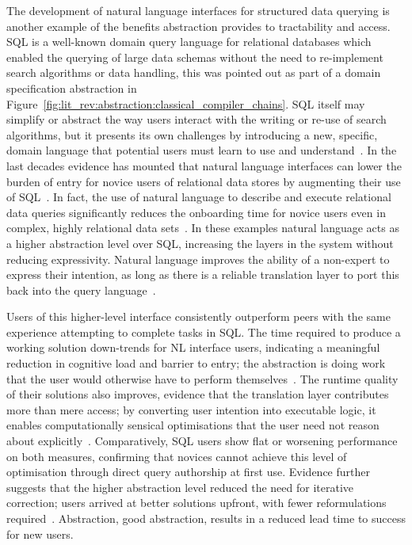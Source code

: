 The development of natural language interfaces for structured data querying is another example of the benefits abstraction provides to tractability and access.
SQL is a well-known domain query language for relational databases which enabled the querying of large data schemas without the need to re-implement search algorithms or data handling, this was pointed out as part of a domain specification abstraction in Figure~\ref{fig:lit_rev:abstraction:classical_compiler_chains}.
SQL itself may simplify or abstract the way users interact with the writing or re-use of search algorithms, but it presents its own challenges by introducing a new, specific, domain language that potential users must learn to use and understand~\cite{IpeirotisZheng2025NLIDBUsers}.
In the last decades evidence has mounted that natural language interfaces can lower the burden of entry for novice users of relational data stores by augmenting their use of SQL~\cite{simitsis2009dbmss, IpeirotisZheng2025NLIDBUsers}.
In fact, the use of natural language to describe and execute relational data queries significantly reduces the onboarding time for novice users even in complex, highly relational data sets~\cite{fei2014, fei2016}.
In these examples natural language acts as a higher abstraction level over SQL, increasing the layers in the system without reducing expressivity.
Natural language improves the ability of a non-expert to express their intention, as long as there is a reliable translation layer to port this back into the query language~\cite{IpeirotisZheng2025NLIDBUsers}.

Users of this higher-level interface consistently outperform peers with the same experience attempting to complete tasks in SQL\@.
The time required to produce a working solution down-trends for NL interface users, indicating a meaningful reduction in cognitive load and barrier to entry; the abstraction is doing work that the user would otherwise have to perform themselves~\cite{IpeirotisZheng2025NLIDBUsers}.
The runtime quality of their solutions also improves, evidence that the translation layer contributes more than mere access; by converting user intention into executable logic, it enables computationally sensical optimisations that the user need not reason about explicitly~\cite{IpeirotisZheng2025NLIDBUsers}.
Comparatively, SQL users show flat or worsening performance on both measures, confirming that novices cannot achieve this level of optimisation through direct query authorship at first use.
Evidence further suggests that the higher abstraction level reduced the need for iterative correction; users arrived at better solutions upfront, with fewer reformulations required~\cite{IpeirotisZheng2025NLIDBUsers}.
Abstraction, good abstraction, results in a reduced lead time to success for new users.

